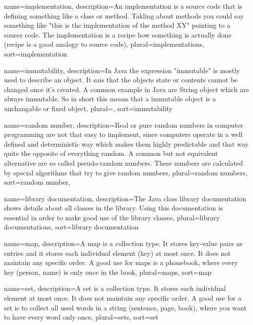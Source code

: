 {
	name=implementation,
	description={An implementation is a source code that is defining
		something like a class or method. Takling about methods
		you could say something like "this is the implementation
		of the method XY" pointing to a source code. The 
		implementation is a recipe how something is actually 
		done (recipe is a good analogy to source code)},
	plural=implementations,
	sort=implementation
}

{
	name=immutability,
	description={In Java the expression "immutable" is mostly used to
		describe an object. It sais that the objects state or 
		contents cannot be changed once it's created. A common
		example in Java are String object which are always
		immutable. So in short this means that a immutable object
		is a unchangable or fixed object},
	plural=,
	sort=immutability
}

{
	name={random number},
	description={Real or pure random numbers in computer programming are
		not that easy to implement, since computers operate in a
		well defined and deterministic way which makes them 
		highly predictable and that way quite the opposite of 
		everything random. A common but not equivalent alternative
		are so called pseudo-random numbers. These numbers are 
		calculated by special algorithms that try to give 
		random numbers},
	plural={random numbers},
	sort={random number},
}

{
	name={library documentation},
	description={The Java class library documentation shows details about
		all classes in the library. Using this documentation is 
		essential in order to make good use of the library classes},
	plural={library documentations},
	sort={library documentation}
}

{
	name=map,
	description={A map is a collection type. It stores key-value pairs as
		entries and it stores each individual 
		element (key) at most once. It does not maintain any specific 
		order. A good use for maps is a phonebook, where every key
		(person, name) is only once in the book},
	plural=maps,
	sort=map
}

{
	name=set,
	description={A set is a collection type. It stores each individual 
		element at most once. It does not maintain any specific order.
		A good use for a set is to collect all used words in a string
		(sentence, page, book), where you want to have every word 
		only once},
	plural=sets,
	sort=set
}


